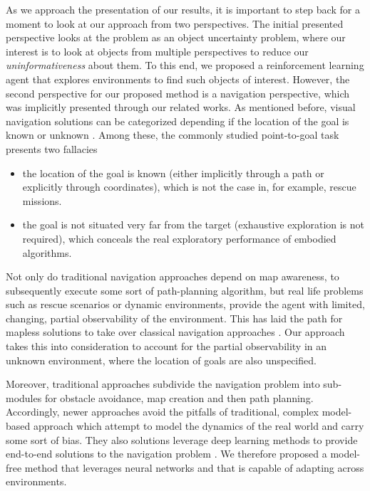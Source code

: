 As we approach the presentation of our results, it is important to step back for a moment to look at our approach from two perspectives. The initial presented perspective looks at the problem as an object uncertainty problem, where our interest is to look at objects from multiple perspectives to reduce our \textit{uninformativeness} about them. To this end, we proposed a reinforcement learning agent that explores environments to find such objects of interest.
However, the second perspective for our proposed method is a navigation perspective, which was implicitly presented through our related works. As mentioned before, visual navigation solutions can be categorized depending if the location of the goal is known or unknown \cite{chaplot2020semantic}. Among these, the commonly studied point-to-goal task presents two fallacies
\begin{itemize}
    \item the location of the goal is known (either implicitly through a path or explicitly through coordinates), which is not the case in, for example, rescue missions.
    \item the goal is not situated very far from the target (exhaustive exploration is not required), which conceals the real exploratory performance of embodied algorithms.
\end{itemize}

Not only do traditional navigation approaches depend on map awareness, to subsequently execute some sort of path-planning algorithm, but real life problems such as rescue scenarios or dynamic environments, provide the agent with limited, changing, partial observability of the environment. This has laid the path for mapless solutions to take over classical navigation approaches \cite{mapslessETH, brandenburger, snapnav}. Our approach takes this into consideration to account for the partial observability in an unknown environment, where the location of goals are also unspecified.

Moreover, traditional approaches subdivide the navigation problem into sub-modules for obstacle avoidance, map creation and then path planning. Accordingly, newer approaches avoid the pitfalls of traditional, complex model-based approach which attempt to model the dynamics of the real world and carry some sort of bias. They also solutions leverage deep learning methods to provide end-to-end solutions to the navigation problem \cite{wang, maplessETH}. We therefore proposed a model-free method that leverages neural networks and that is capable of adapting across environments.  

